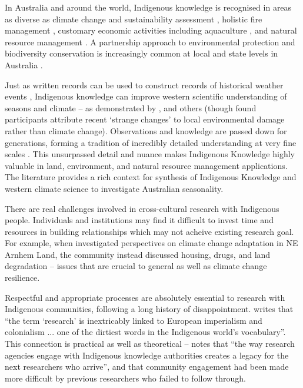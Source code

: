 In Australia and around the world, Indigenous knowledge is recognised
in areas as diverse as climate change and sustainability assessment
\citep[eg.][]{cochran2015}, holistic fire management \citep[eg.][]{clarke2009,price2012},
customary economic activities including aquaculture \citep{woodward2012a}, and
natural resource management \citep[eg.][]{prober2011}.  A partnership approach
to environmental protection and biodiversity conservation is increasingly
common at local and state levels in Australia \citep{ens2012}.


Just as written records can be used to construct records of historical weather
events \citep[eg.][]{rodrigo1999}, Indigenous knowledge can improve western
scientific understanding of seasons and climate -- as demonstrated by
\citet{green2010a,clarke2009}, and others (though \citet{green2010a} found
participants attribute recent `strange changes' to local environmental damage
rather than climate change).
%
Observations and knowledge are passed down for generations, forming a
tradition of incredibly detailed understanding at very fine scales \citep{barber2005}.
This unsurpassed detail and nuance makes Indigenous Knowledge highly valuable
in land, environment, and natural resource management applications.
The literature provides a rich context for synthesis of Indigenous Knowledge
and western climate science to investigate Australian seasonality.


There are real challenges involved in cross-cultural research with
Indigenous people.  Individuals and institutions may find it difficult to
invest time and resources in building relationships which may not acheive
existing research goal.  For example, when \citet{petheram2010}
investigated perspectives on climate change adaptation in NE Arnhem Land,
the community instead discussed housing, drugs, and land degradation -- issues
that are crucial to general as well as climate change resilience.

Respectful and appropriate processes are absolutely essential to research with Indigenous communities,
following a long history of disappointment.  \citet{smith1999} writes that ``the term
`research' is inextricably linked to European imperialism and colonialism ...
one of the dirtiest words in the Indigenous world's vocabulary''. This
connection is practical as well as theoretical -- \citet{woodward2010} notes
that ``the way research agencies engage with Indigenous knowledge authorities
creates a legacy for the next researchers who arrive'', and that community
engagement had been made more difficult by previous researchers who failed to
follow through.

